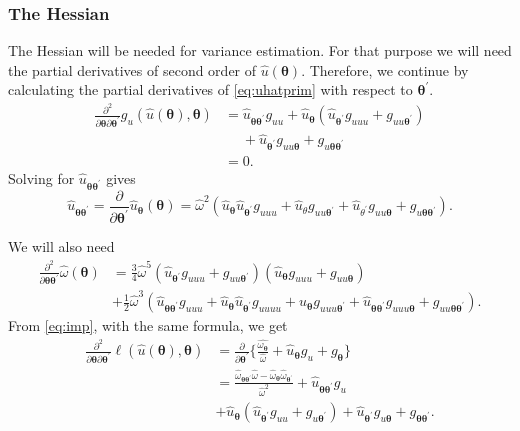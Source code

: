 \documentclass[a4paper,11pt]{article}
\newcommand{\btheta}{\ensuremath{\boldsymbol{\theta}}}
\begin{document}
\subsubsection{The Hessian}

The Hessian will be needed for
variance estimation. For that purpose we will need the partial
derivatives of second order of $\hat{u}(\btheta)$. Therefore, we continue by
calculating the partial derivatives of \eqref{eq:uhatprim} 
 with respect to $\btheta^{\prime}$.
\begin{equation*}
\begin{split}
\frac{\partial^2}{\partial \btheta \partial \btheta^{\prime}}
g_u(\hat{u}(\btheta), \btheta) &= \hat{u}_{\btheta\btheta^{\prime}} g_{uu} +
\hat{u}_{\btheta} (\hat{u}_{\btheta^{\prime}}g_{uuu} +
g_{uu\btheta^{\prime}})\\ 
& \quad \; + \hat{u}_{\btheta^{\prime}} g_{uu\btheta} +
g_{u\btheta\btheta^{\prime}} \\ 
&= 0.
\end{split}
\end{equation*}
Solving for $\hat{u}_{\btheta\btheta^{\prime}}$ gives
\begin{equation*}
\hat{u}_{\btheta\btheta^{\prime}} = \frac{\partial}{\partial
  \btheta^{\prime}} \hat{u}_{\btheta}(\btheta) = \hat{\omega}^2 (\hat{u}_{\btheta}\hat{u}_{\btheta^{\prime}} g_{uuu} + 
\hat{u}_{\theta} g_{uu\btheta^{\prime}} +
\hat{u}_{\theta^{\prime}} g_{uu\btheta} + g_{u\btheta\btheta^{\prime}}).
\end{equation*}

We will also need 
\begin{equation*}
\begin{split}
\frac{\partial^2}{\partial \btheta \btheta^{\prime}} \hat{\omega}(\btheta)
&= \frac{3}{4} 
\hat{\omega}^5 (\hat{u}_{\btheta^{\prime}}g_{uuu} + g_{uu\btheta^{\prime}})
( \hat{u}_{\btheta} g_{uuu} + g_{uu\btheta}) \\
& + \frac{1}{2} \hat{\omega}^3 (
\hat{u}_{\btheta\btheta^{\prime}} g_{uuu} + \hat{u}_{\btheta}
\hat{u}_{\btheta^{\prime}} g_{uuuu} + \hat{u}_{\btheta}
g_{uuu\btheta^{\prime}} + \hat{u}_{\btheta\btheta^{\prime}}
  g_{uuu\btheta} + g_{uu\btheta\btheta^{\prime}}).
\end{split}
\end{equation*}
From \eqref{eq:imp}, with the same formula, we get
\begin{equation*}
\begin{split}
\frac{\partial^2}{\partial \btheta \partial \btheta^{\prime}}
\ell(\hat{u}(\btheta), \btheta) &= 
\frac{\partial}{\partial \btheta^{\prime}}\biggl\{
\frac{\hat{\omega_{\btheta}}}{\hat{\omega}} + 
\hat{u}_{\btheta} g_u  + g_{\btheta}\biggr\}
\\
&= \frac{\hat{\omega}_{\btheta\btheta^{\prime}} \hat{\omega} -
  \hat{\omega}_{\btheta}\hat{\omega}_{\btheta^{\prime}}}{\hat{\omega}^2} + 
\hat{u}_{\btheta\btheta^{\prime}}g_u \\
& + \hat{u}_{\btheta}(
\hat{u}_{\btheta^{\prime}} g_{uu} + g_{u\btheta^{\prime}}) + 
\hat{u}_{\btheta^{\prime}} g_{u\btheta} +
g_{\btheta\btheta^{\prime}}. 
\end{split}
\end{equation*}
\end{document}
